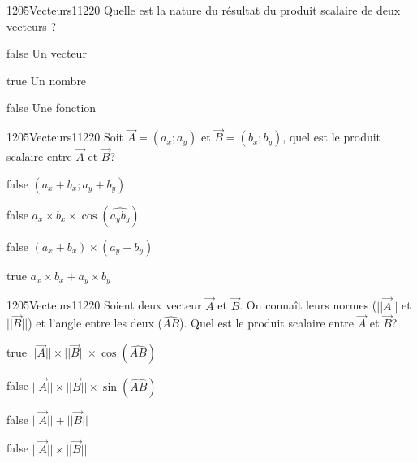 \documentclass[11pt]{article}
\begin{document}
            \begin{question}{1205}{Vecteurs}{1}{1220}
				Quelle est la nature du résultat du produit scalaire de deux vecteurs ?
            \end{question}

            \begin{reponses}
            	\item[false] Un vecteur
            	\item[true] Un nombre
                \item[false] Une fonction
            \end{reponses}
            
        	\begin{question}{1205}{Vecteurs}{1}{1220}
				Soit $\vec{A}=(a_x;a_y)$ et $\vec{B}=(b_x;b_y)$, quel est le produit scalaire entre $\vec{A}$ et $\vec{B}$?
            \end{question}

            \begin{reponses}
            	\item[false] $(a_x+b_x;a_y+b_y)$
            	\item[false] $a_x\times b_x\times \cos(\widehat{a_y b_y})$
                \item[false] $(a_x+b_x)\times (a_y+b_y)$
                \item[true] $a_x\times b_x+a_y\times b_y$
            \end{reponses}
        
        	\begin{question}{1205}{Vecteurs}{1}{1220}
				Soient deux vecteur $\vec{A}$ et $\vec{B}$. On connaît leurs normes ($||\vec{A}||$ et $||\vec{B}||$) et l'angle entre les deux ($\widehat{AB}$). Quel est le produit scalaire entre $\vec{A}$ et $\vec{B}$?
            \end{question}

            \begin{reponses}
            	\item[true] $||\vec{A}||\times ||\vec{B}||\times \cos(\widehat{AB})$
            	\item[false] $||\vec{A}||\times ||\vec{B}||\times \sin(\widehat{AB})$
                \item[false] $||\vec{A}||+||\vec{B}||$
                \item[false] $||\vec{A}||\times ||\vec{B}||$
            \end{reponses}
\end{document}

